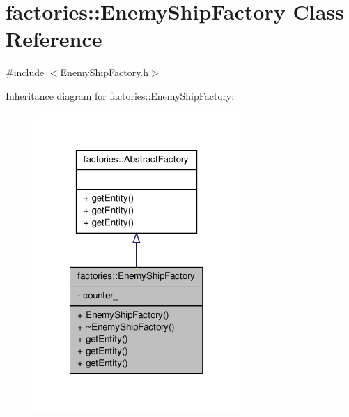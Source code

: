 \hypertarget{classfactories_1_1EnemyShipFactory}{\section{factories\-:\-:\-Enemy\-Ship\-Factory \-Class \-Reference}
\label{d4/df0/classfactories_1_1EnemyShipFactory}
}


{\ttfamily \#include $<$\-Enemy\-Ship\-Factory.\-h$>$}



\-Inheritance diagram for factories\-:\-:\-Enemy\-Ship\-Factory\-:\nopagebreak
\begin{figure}[H]
\begin{center}
\leavevmode
\includegraphics[width=222pt]{d5/dee/classfactories_1_1EnemyShipFactory__inherit__graph}
\end{center}
\end{figure}


